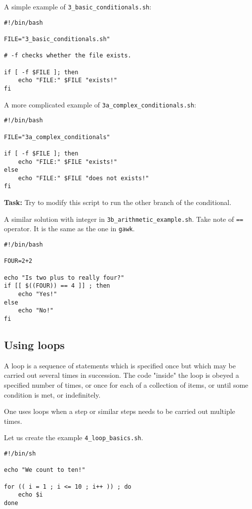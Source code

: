 \documentclass{article}\usepackage[]{graphicx}\usepackage[usenames,dvipsnames]{color}
\begin{document}
A simple example of \verb+3_basic_conditionals.sh+:

\begin{verbatim}
#!/bin/bash

FILE="3_basic_conditionals.sh"

# -f checks whether the file exists.

if [ -f $FILE ]; then
    echo "FILE:" $FILE "exists!"
fi
\end{verbatim}

A more complicated example of \verb+3a_complex_conditionals.sh+:

\begin{verbatim}
#!/bin/bash

FILE="3a_complex_conditionals"

if [ -f $FILE ]; then
    echo "FILE:" $FILE "exists!"
else
    echo "FILE:" $FILE "does not exists!"
fi
\end{verbatim}

\textbf{Task:} Try to modify this script to run the other branch of the conditional.

A similar solution with integer in \verb+3b_arithmetic_example.sh+. Take note of \verb+==+ operator. It is the same as the one in \verb+gawk+.

\begin{verbatim}
#!/bin/bash

FOUR=2+2

echo "Is two plus to really four?"
if [[ $((FOUR)) == 4 ]] ; then
    echo "Yes!"
else
    echo "No!"
fi
\end{verbatim}

\subsection*{Using loops}

A loop is a sequence of statements which is specified once but which may be carried out several times in succession. The code "inside" the loop is obeyed a specified number of times, or once for each of a collection of items, or until some condition is met, or indefinitely.

One uses loops when a step or similar steps needs to be carried out multiple times.

Let us create the example \verb+4_loop_basics.sh+.

\begin{verbatim}
#!/bin/sh

echo "We count to ten!"

for (( i = 1 ; i <= 10 ; i++ )) ; do
    echo $i
done
\end{verbatim}
\end{document}
